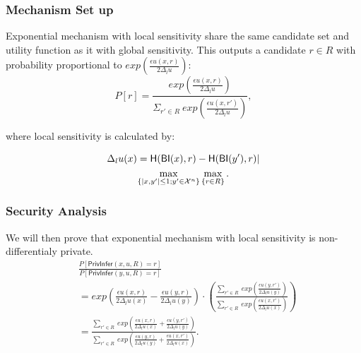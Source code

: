 \documentclass{article}
\begin{document}
\subsubsection{Mechanism Set up}
Exponential mechanism with local sensitivity share the same candidate set and utility function as it with global sensitivity. This outputs a candidate $r \in R$ with probability proportional to $exp(\frac{\epsilon u(x,r)}{2 \Delta_{l}u})$:
\begin{equation*}
P[r] = \frac
{exp(\frac{\epsilon u(x,r)}{2 \Delta_{l}u})}
{\Sigma_{r' \in R}\ exp(\frac{\epsilon u(x,r')}{2 \Delta_{l}u})},
\end{equation*}

where local sensitivity is calculated by:

\begin{multline*}
\Delta_{l}u(x) = 
\mathsf{H}(\mathsf{BI}(x), r) - \mathsf{H}(\mathsf{BI}(y'), r)|\\
\max_{\{|x,y'| \leq 1;y'\in \mathcal{X}^n\}}\max_{\{r\in R\}}.
\end{multline*}

\subsubsection{Security Analysis}
We will then prove that exponential mechanism with local sensitivity is non-differentialy private.
\begin{equation*}
\begin{split}
& \frac{P[\mathsf{PrivInfer}(x,u,R) = r]}{P[\mathsf{PrivInfer}(y,u,R) = r]} \\
& = exp\left(
\frac{\epsilon u(x,r)}{2 \Delta_{l}u(x)} - 
\frac{\epsilon u(y,r)}{2 \Delta_{l}u(y)}
\right)  \cdot
\left(\frac
{\sum\limits_{r' \in R}\ exp(\frac{\epsilon u(y,r')}{2 \Delta_{l}u(y)})}
{\sum\limits_{r' \in R}\ exp(\frac{\epsilon u(x,r')}{2 \Delta_{l}u(x)})}
\right) \\
& = \frac
{\sum\limits_{r' \in R}\ exp(\frac{\epsilon u(x,r)}{2 \Delta_{l}u(x)} 
+ \frac{\epsilon u(y,r')}{2 \Delta_{l}u(y)})}
{\sum\limits_{r' \in R}\ exp(\frac{\epsilon u(y,r)}{2 \Delta_{l}u(y)} 
+ \frac{\epsilon u(x,r')}{2 \Delta_{l}u(x)})}.
\end{split}
\end{equation*}
\end{document}

